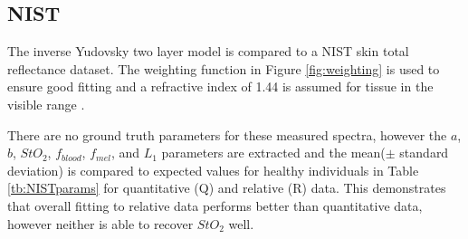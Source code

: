 \subsection{NIST}\label{sec:resultsNIST}
The inverse Yudovsky two layer model is compared to a NIST skin total reflectance dataset. The weighting function in Figure \ref{fig:weighting} is used to ensure good fitting and a refractive index of 1.44 is assumed for tissue in the visible range \cite{Yudovsky2009}. 

There are no ground truth parameters for these measured spectra, however the $a$, $b$, $StO_2$, $f_{blood}$, $f_{mel}$, and $L_1$ parameters are extracted and the mean($\pm$ standard deviation) is compared to expected values for healthy individuals \cite{Jacques2013, VanManen2021, Nishidate2011, Lintzeri2022} in Table \ref{tb:NISTparams} for quantitative (Q) and relative (R) data. This demonstrates that overall fitting to relative data performs better than quantitative data, however neither is able to recover $StO_2$ well. 

